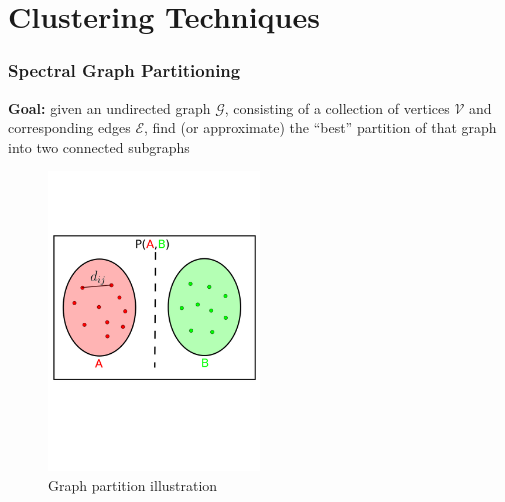 \documentclass[9pt]{beamer}
\begin{document}
\section{Clustering Techniques}
\label{sec-2}
\begin{frame}
\frametitle{Spectral Graph Partitioning}
\label{sec-2-1}

\textbf{Goal:} given an undirected graph $\mathcal{G}$, consisting of a
  collection of vertices $\mathcal{V}$ and corresponding edges
  $\mathcal{E}$, find (or approximate) the ``best'' partition of that
  graph into two connected subgraphs
\vspace*{-0.5cm}\begin{figure}
    \includegraphics[width=0.5\textwidth]{GraphPartition.png}
    \caption{Graph partition illustration}
\end{figure}
\end{frame}
\end{document}
